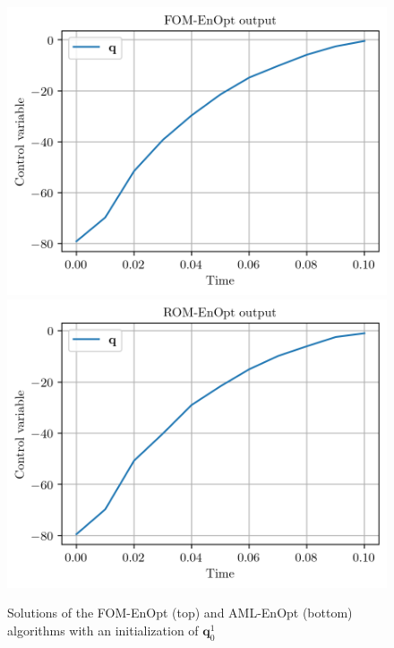 \begin{figure}
\centering
\includegraphics{Plots/FOMInit0.png}
\includegraphics{Plots/ROMInit0.png}
\caption{\label{solutionsInit0}Solutions of the FOM-EnOpt (top) and AML-EnOpt (bottom) algorithms with an initialization of $\mathbf{q}^1_0$}
\end{figure}

